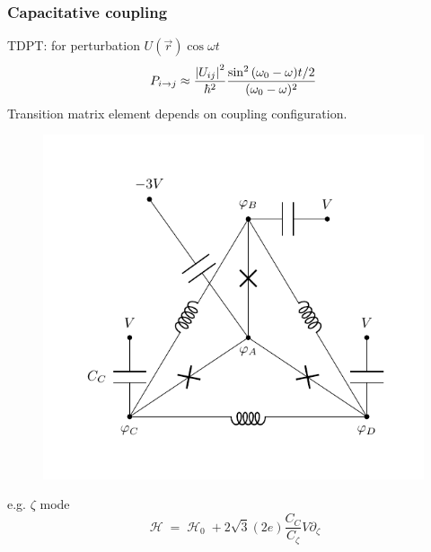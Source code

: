 \documentclass[10pt]{beamer}
\DeclareMathOperator{\ham}{\mathcal{H}}
\begin{document}
\begin{frame}[shrink=10]
\begin{figure}
	\hspace{1em}
\end{figure}
\end{frame}




\begin{frame}[shrink=10]
\frametitle{Capacitative coupling}
\vspace{2em}
TDPT: for perturbation $U(\vec{r}) \cos{\omega t}$
\begin{equation}
P_{i \rightarrow j} \approx \frac{\abs{U_{ij}}^2}{\hbar^2} \frac{\sin^2{(\omega_0-\omega)t/2}}{(\omega_0-\omega)^2}
\end{equation}
Transition matrix element depends on coupling configuration. 
\begin{minipage}[c]{0.45\linewidth}
\begin{figure}
	\centering
	\includegraphics[trim={0cm 1cm 0cm 1cm}, clip, width=1\textwidth]{triflux_zeta_couple.pdf}
\end{figure}
\end{minipage} 
\begin{minipage}[c]{0.45\linewidth}
e.g. $\zeta$ mode
\begin{equation}
\ham = \ham_0 + 2 \sqrt{3} (2e) \frac{C_C}{C_\zeta} V \partial_\zeta
\end{equation}
\end{minipage}
\end{frame}
\end{document}
